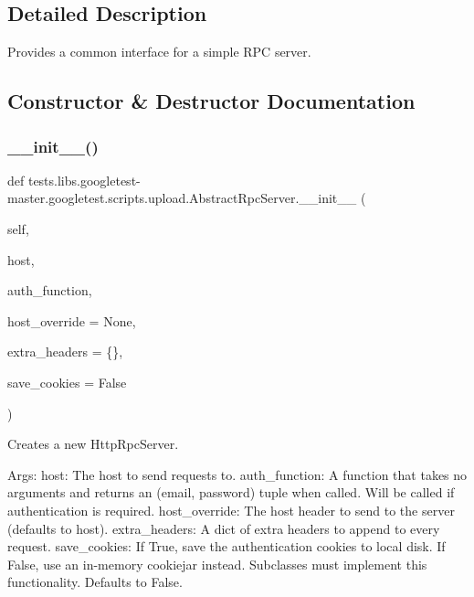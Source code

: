 \subsection{Detailed Description}
\begin{DoxyVerb}Provides a common interface for a simple RPC server.\end{DoxyVerb}
 

\subsection{Constructor \& Destructor Documentation}
\mbox{\label{classtests_1_1libs_1_1googletest-master_1_1googletest_1_1scripts_1_1upload_1_1AbstractRpcServer_a296f01a02e140393a05b984061e9b547}} 
\subsubsection{\texorpdfstring{\+\_\+\+\_\+init\+\_\+\+\_\+()}{\_\_init\_\_()}}
{\footnotesize\ttfamily def tests.\+libs.\+googletest-\/master.\+googletest.\+scripts.\+upload.\+Abstract\+Rpc\+Server.\+\_\+\+\_\+init\+\_\+\+\_\+ (\begin{DoxyParamCaption}\item[{}]{self,  }\item[{}]{host,  }\item[{}]{auth\+\_\+function,  }\item[{}]{host\+\_\+override = {\ttfamily None},  }\item[{}]{extra\+\_\+headers = {\ttfamily \{\}},  }\item[{}]{save\+\_\+cookies = {\ttfamily False} }\end{DoxyParamCaption})}

\begin{DoxyVerb}Creates a new HttpRpcServer.

Args:
  host: The host to send requests to.
  auth_function: A function that takes no arguments and returns an
(email, password) tuple when called. Will be called if authentication
is required.
  host_override: The host header to send to the server (defaults to host).
  extra_headers: A dict of extra headers to append to every request.
  save_cookies: If True, save the authentication cookies to local disk.
If False, use an in-memory cookiejar instead.  Subclasses must
implement this functionality.  Defaults to False.
\end{DoxyVerb}
 

